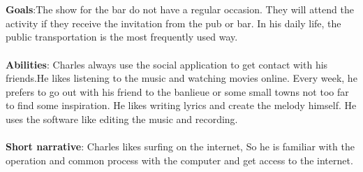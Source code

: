 \documentclass[11pt, english]{report}
\begin{document}
\\\\
\textbf{Goals}:The show for the bar do not have a regular occasion. They will attend the activity if they receive the invitation from the pub or bar. In his daily life, the public transportation is the most frequently used way.
\\\\
\textbf{Abilities}: Charles always use the social application to get contact with his friends.He likes listening to the music and watching movies online. Every week, he prefers to go out with his friend to the banlieue or some small towns not too far to find some inspiration. He likes writing lyrics and create the melody himself. He uses the software like editing the music and recording.
\\\\
\textbf{Short narrative}: Charles likes surfing on the internet, So he is familiar with the operation and common process with the computer and get access to the internet. \\
\end{document}

